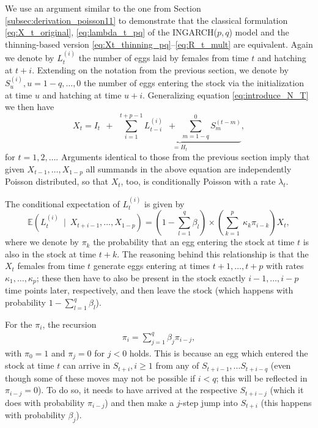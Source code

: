 \documentclass[review]{elsarticle}
\begin{document}
We use an argument similar to the one from Section \ref{subsec:derivation_poisson11} to demonstrate that the classical formulation \eqref{eq:X_t_original}, \eqref{eq:lambda_t_pq} of the INGARCH($p, q$) model and the thinning-based version \eqref{eq:Xt_thinning_pq}--\eqref{eq:R_t_mult} are equivalent. Again we denote by $L_t^{(i)}$ the number of eggs laid by females from time $t$ and hatching at $t + i$. Extending on the notation from the previous section, we denote by $S^{(i)}_u, u = 1 - q, \dots, 0$ the number of eggs entering the stock via the initialization at time $u$ and hatching at time $u + i$. Generalizing equation \eqref{eq:introduce_N_T} we then have
$$
X_t = I_t \ \ + \ \ \underbrace{\sum_{i = 1}^{t + p - 1} L_{t - i}^{(i)} \ \ + \ \ \sum_{m = 1 - q}^0 S_m^{(t - m)}}_{= H_t}, \label{eq:introduce_N_T}
$$
for $t = 1, 2, \dots$. Arguments identical to those from the previous section imply that given $X_{t - 1}, \dots, X_{1 - p}$ all summands in the above equation are independently Poisson distributed, so that $X_t$, too, is conditionally Poisson with a rate $\lambda_t$.

The conditional expectation of $L_t^{(i)}$ is given by
\begin{equation}
\mathbb{E}(L_t^{(i)} \ \mid \ X_{t + i - 1}, \dots, X_{1 - p}) = \left(1 - \sum_{l = 1}^q \beta_l \right) \times \left(\sum_{k = 1}^p\ \kappa_k \pi_{i - k}\right) X_t,\label{eq:ELt}
\end{equation}
where we denote by $\pi_k$ the probability that an egg entering the stock at time $t$ is also in the stock at time $t + k$. The reasoning behind this relationship is that the $X_t$ females from time $t$ generate eggs entering at times $t + 1, \dots, t + p$ with rates $\kappa_1, \dots, \kappa_p$; these then have to also be present in the stock exactly $i - 1, \dots, i - p$ time points later, respectively, and then leave the stock (which happens with probability $1 - \sum_{l = 1}^q \beta_l$).

For the $\pi_i$, the recursion
\begin{align}
\pi_i = \sum_{j = 1}^q \beta_j \pi_{i - j}, \label{eq:recursion_pi}
\end{align}
with $\pi_0 = 1$ and $\pi_j = 0$ for $j < 0$ holds. This is because an egg which entered the stock at time $t$ can arrive in $S_{t + i}, i \geq 1$ from any of $S_{t + i - 1}, \dots S_{t + i - q}$ (even though some of these moves may not be possible if $i < q$; this will be reflected in $\pi_{i - j} = 0$). To do so, it needs to have arrived at the respective $S_{t + i - j}$ (which it does with probability $\pi_{i - j}$) and then make a $j$-step jump into $S_{t + i}$ (this happens with probability $\beta_j$).
\end{document}
